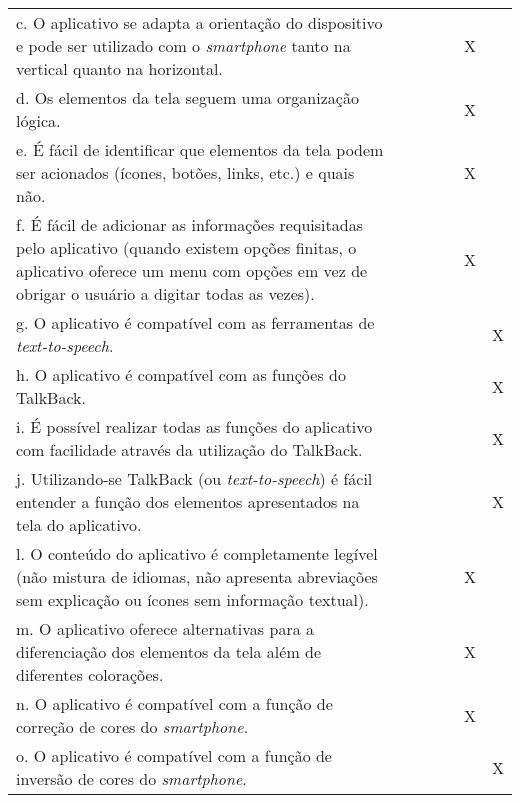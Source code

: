 \documentclass[portuguese,oneside]{tcc}
\begin{document}
\begin{center}
\begin{longtabu}{|L{25em}|c|c|c|c|c|c|}
			c. O aplicativo se adapta a orientação do dispositivo e pode ser utilizado com o \emph{smartphone} tanto na vertical quanto na horizontal. & & & & & X & \\ 
			d. Os elementos da tela seguem uma organização lógica. & & & & & X & \\ 
			e. É fácil de identificar que elementos da tela podem ser acionados (ícones, botões, links, etc.) e quais não. & & & & & X & \\ 
			f. É fácil de adicionar as informações requisitadas pelo aplicativo (quando existem opções finitas, o aplicativo oferece um menu com opções em vez de obrigar o usuário a digitar todas as vezes). & & & & & X & \\ 
			g. O aplicativo é compatível com as ferramentas de \emph{text-to-speech}. & & & & & & X \\ 
			h. O aplicativo é compatível com as funções do TalkBack. & & & & & & X \\ 
			i. É possível realizar todas as funções do aplicativo com facilidade através da utilização do TalkBack.	& & & & & & X \\ 
			j. Utilizando-se TalkBack (ou \emph{text-to-speech}) é fácil entender a função dos elementos apresentados na tela do aplicativo. & & & & & & X \\ 
			l. O conteúdo do aplicativo é completamente legível (não mistura de idiomas, não apresenta abreviações sem explicação ou ícones sem informação textual). & & & & & X & \\ 
			m. O aplicativo oferece alternativas para a diferenciação dos elementos da tela além de diferentes colorações. & & & & & X & \\ 
			n. O aplicativo é compatível com a função de correção de cores do \emph{smartphone}. & & & & & X & \\ 
			o. O aplicativo é compatível com a função de inversão de cores do \emph{smartphone}. & & & & & & X \\ 
		\end{longtabu}
	\end{center}
																																				
\end{document}
